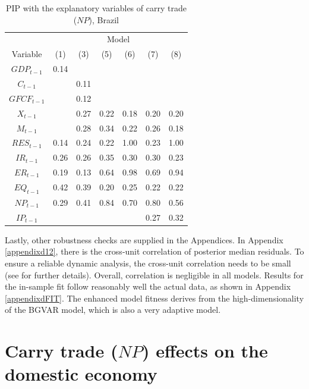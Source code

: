 \documentclass[a4paper, twoside]{templates/ociamthesis}
\begin{document}
\begin{table}[!ht]

\caption{\label{tab:Table55BR}PIP with the explanatory variables of carry trade ($NP$), Brazil}
\centering
\fontsize{9}{11}\selectfont
\begin{tabular}[t]{ccccccc}
\toprule
\multicolumn{1}{c}{ } & \multicolumn{6}{c}{Model} \\
\cmidrule(l{3pt}r{3pt}){2-7}
Variable & (1) & (3) & (5) & (6) & (7) & (8)\\
\midrule
$GDP_{t-1}$ & 0.14 &  &  &  &  & \\
$C_{t-1}$ &  & 0.11 &  &  &  & \\
$GFCF_{t-1}$ &  & 0.12 &  &  &  & \\
$X_{t-1}$ &  & 0.27 & 0.22 & 0.18 & 0.20 & 0.20\\
$M_{t-1}$ &  & 0.28 & 0.34 & 0.22 & 0.26 & 0.18\\
$RES_{t-1}$ & 0.14 & 0.24 & 0.22 & 1.00 & 0.23 & 1.00\\
$IR_{t-1}$ & 0.26 & 0.26 & 0.35 & 0.30 & 0.30 & 0.23\\
$ER_{t-1}$ & 0.19 & 0.13 & 0.64 & 0.98 & 0.69 & 0.94\\
$EQ_{t-1}$ & 0.42 & 0.39 & 0.20 & 0.25 & 0.22 & 0.22\\
$NP_{t-1}$ & 0.29 & 0.41 & 0.84 & 0.70 & 0.80 & 0.56\\
$IP_{t-1}$ &  &  &  &  & 0.27 & 0.32\\
\bottomrule
\end{tabular}
\end{table}

Lastly, other robustness checks are supplied in the Appendices. In Appendix \ref{appendixd12}, there is the cross-unit correlation of posterior median residuals. To ensure a reliable dynamic analysis, the cross-unit correlation needs to be small (see \textcite{dees2007} for further details). Overall, correlation is negligible in all models. Results for the in-sample fit follow reasonably well the actual data, as shown in Appendix \ref{appendixdFIT}. The enhanced model fitness derives from the high-dimensionality of the BGVAR model, which is also a very adaptive model.

\hypertarget{fivethree}{%
\section{\texorpdfstring{Carry trade (\(NP\)) effects on the domestic economy}{Carry trade (NP) effects on the domestic economy}}\label{fivethree}}
\end{document}
